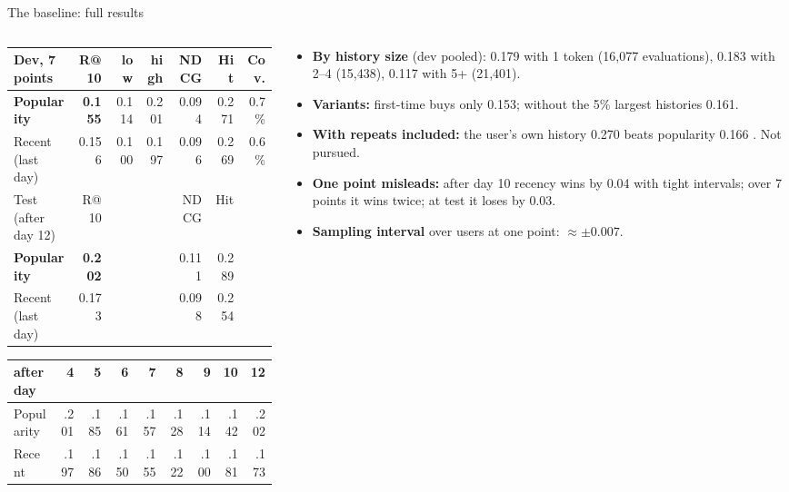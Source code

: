 \documentclass[aspectratio=169,10pt]{beamer}
\newcommand{\toindex}{\hfill\hyperlink{index}{\beamerreturnbutton{index}}}
\begin{document}
\begin{frame}[label=baseline]{The baseline: full results \toindex}
  \scriptsize
  \begin{columns}[T]
    \begin{column}{0.55\textwidth}
      \begin{tabular}{@{}lrrrrrr@{}}
        \toprule
        Dev, 7 points & R@10 & low & high & NDCG & Hit & Cov. \\
        \midrule
        \textbf{Popularity} & \textbf{0.155} & 0.114 & 0.201 & 0.094 & 0.271 & 0.7\% \\
        Recent (last day) & 0.156 & 0.100 & 0.197 & 0.096 & 0.269 & 0.6\% \\
        \midrule
        Test (after day 12) & R@10 & & & NDCG & Hit & \\
        \midrule
        \textbf{Popularity} & \textbf{0.202} & & & 0.111 & 0.289 & \\
        Recent (last day) & 0.173 & & & 0.098 & 0.254 & \\
        \bottomrule
      \end{tabular}
      \par\medskip
      \begin{tabular}{@{}lrrrrrrrr@{}}
        \toprule
        after day & 4 & 5 & 6 & 7 & 8 & 9 & 10 & 12 \\
        \midrule
        Popularity & .201 & .185 & .161 & .157 & .128 & .114 & .142 & .202 \\
        Recent & .197 & .186 & .150 & .155 & .122 & .100 & .181 & .173 \\
        \bottomrule
      \end{tabular}
    \end{column}
    \begin{column}{0.42\textwidth}
      \begin{itemize}
        \item \textbf{By history size} (dev pooled): 0.179 with 1 token (16{,}077 evaluations), 0.183 with 2--4 (15{,}438), 0.117 with 5+ (21{,}401).
        \item \textbf{Variants:} first-time buys only 0.153; without the 5\% largest histories 0.161.
        \item \textbf{With repeats included:} the user's own history 0.270 beats popularity 0.166 \cite{li2021}. Not pursued.
        \item \textbf{One point misleads:} after day 10 recency wins by 0.04 with tight intervals; over 7 points it wins twice; at test it loses by 0.03.
        \item \textbf{Sampling interval} over users at one point: $\approx\pm0.007$.
      \end{itemize}
    \end{column}
  \end{columns}
\end{frame}
\end{document}
